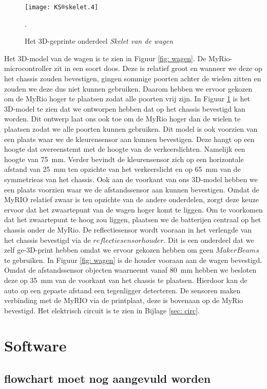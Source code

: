 \documentclass[a4paper,twoside,kulak]{kulakreport}
\begin{document}
	\begin{figure}[h]
		\centering
		\texttt{[image: KS®skelet.4]}
		\caption{Het 3D-geprinte onderdeel \textit{Skelet van de wagen} }.
		\label{fig: skelet}
	\end{figure}
\newpage
	Het 3D-model van de wagen is te zien in Figuur \ref{fig: wagen}.
	De MyRio-microcontroller zit in een soort doos. Deze is relatief groot en wanneer we deze op het chassis zouden bevestigen, gingen sommige poorten achter de wielen zitten en zouden we deze dus niet kunnen gebruiken. Daarom hebben we ervoor gekozen om de MyRio hoger te plaatsen zodat alle poorten vrij zijn. In Figuur \ref{fig: skelet} is het 3D-model te zien dat we ontworpen hebben dat op het chassis bevestigd kan worden. Dit ontwerp laat ons ook toe om de MyRio hoger dan de wielen te plaatsen zodat we alle poorten kunnen gebruiken. Dit model is ook voorzien van een plaats waar we de kleurensensor aan kunnen bevestigen. Deze hangt op een hoogte dat overeenstemt met de hoogte van de verkeerslichten. Namelijk een hoogte van 75~mm. Verder bevindt de kleurensensor zich op een horizontale afstand van 25~mm ten opzichte van het verkeerslicht en op 65~mm van de symmetrieas van het chassis. Ook aan de voorkant van ons 3D-model hebben we een plaats voorzien waar we de afstandssensor aan kunnen bevestigen. 
 	Omdat de MyRIO relatief zwaar is ten opzichte van de andere onderdelen, zorgt deze keuze ervoor dat het zwaartepunt van de wagen hoger komt te liggen. Om te voorkomen dat het zwaartepunt te hoog zou liggen, plaatsen we de batterijen centraal op het chassis onder de MyRio. De reflectiesensor wordt vooraan in het verlengde van het chassis bevestigd via de $reflectiesensorhouder$. Dit is een onderdeel dat we zelf ge-3D-print hebben omdat we ervoor gekozen hebben om geen $MakerBeams$ te gebruiken. In Figuur \ref{fig: wagen} is de houder vooraan aan de wagen bevestigd. Omdat de afstandssensor objecten waarneemt vanaf 80~mm hebben we besloten deze op 35~mm van de voorkant van het chassis te plaatsen. Hierdoor kan de auto op een gepaste afstand een tegenligger detecteren.  De sensoren maken verbinding met de MyRIO via de printplaat, deze is bovenaan op de MyRio bevestigd. Het elektrisch circuit is te zien in Bijlage \ref{sec: circ}. 
	
\section{Software}

\subsection{flowchart moet nog aangevuld worden}
\end{document}
